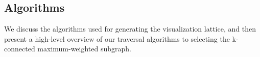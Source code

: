 
\subsection{Algorithms\label{sec:algorithms}}
We discuss the algorithms used for generating the visualization lattice, and then present a high-level overview of our traversal algorithms to selecting the k-connected maximum-weighted subgraph.

